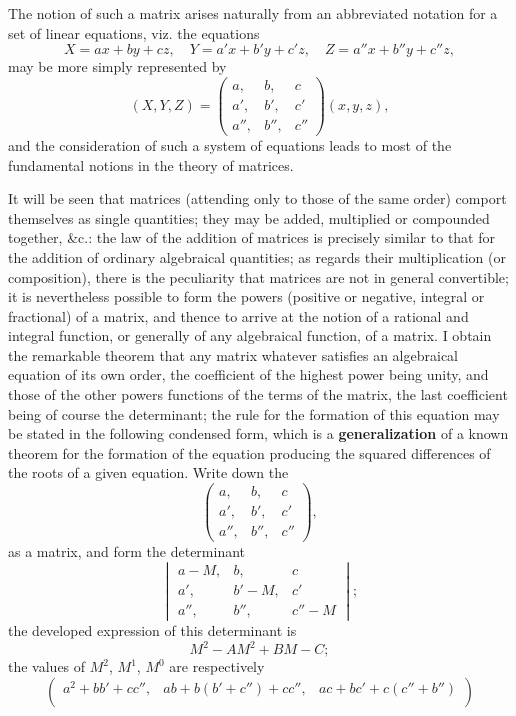 \documentclass[11pt,a4paper]{book}
\begin{document}
\begin{center}
The notion of such a matrix arises naturally from an abbreviated notation for a set of linear equations, viz. the equations
\[
X = ax + by + cz,\quad Y = a'x + b'y + c'z,\quad Z = a''x + b''y + c''z,
\]
may be more simply represented by
\[
(X, Y, Z) = \begin{pmatrix} a, & b, & c \\ a', & b', & c' \\ a'', & b'', & c'' \end{pmatrix}(x, y, z),
\]
and the consideration of such a system of equations leads to most of the fundamental notions in the theory of matrices.

It will be seen that matrices (attending only to those of the same order) comport themselves as single quantities; they may be added, multiplied or compounded together, \&c.: the law of the addition of matrices is precisely similar to that for the addition of ordinary algebraical quantities; as regards their multiplication (or composition), there is the peculiarity that matrices are not in general convertible; it is nevertheless possible to form the powers (positive or negative, integral or fractional) of a matrix, and thence to arrive at the notion of a rational and integral function, or generally of any algebraical function, of a matrix. I obtain the remarkable theorem that any matrix whatever satisfies an algebraical equation of its own order, the coefficient of the highest power being unity, and those of the other powers functions of the terms of the matrix, the last coefficient being of course the determinant; the rule for the formation of this equation may be stated in the following condensed form, which is a {\bfseries generalization} of a known theorem for the formation of the equation producing the squared differences of the roots of a given equation. Write down the 
\[
\begin{pmatrix}
a, & b, & c \\
a', & b', & c' \\
a'', & b'', & c''
\end{pmatrix},
\]
as a matrix, and form the determinant
\[
\begin{vmatrix}
a-M, & b, & c \\
a', & b'-M, & c' \\
a'', & b'', & c''-M
\end{vmatrix};
\]
the developed expression of this determinant is
\[M^2 - AM^2 + BM - C;\]
the values of $M^2$, $M^1$, $M^0$ are respectively
\[
\begin{pmatrix}
a^2+bb'+cc'', & ab+b(b'+c'')+cc'', & ac+bc'+c(c''+b'') \\

\end{pmatrix}\]
\end{center}
\end{document}
